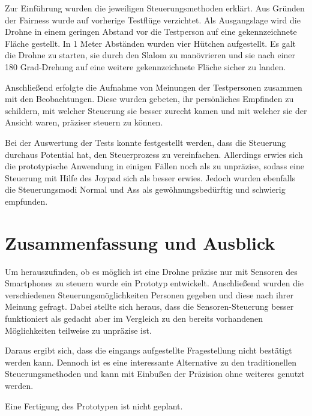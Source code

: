 \documentclass{article}
\begin{document}
Zur Einführung wurden die jeweiligen Steuerungsmethoden erklärt. Aus Gründen der Fairness wurde auf vorherige Testflüge verzichtet. Als Ausgangslage wird die Drohne in einem geringen Abstand vor die Testperson auf eine gekennzeichnete Fläche gestellt. In 1 Meter Abständen wurden vier Hütchen aufgestellt. Es galt die Drohne zu starten, sie durch den Slalom zu manövrieren und sie nach einer 180 Grad-Drehung auf eine weitere gekennzeichnete Fläche sicher zu landen.

Anschließend erfolgte die Aufnahme von Meinungen der Testpersonen zusammen mit den Beobachtungen. Diese wurden gebeten, ihr persönliches Empfinden zu schildern, mit welcher Steuerung sie besser zurecht kamen und mit welcher sie der Ansicht waren, präziser steuern zu können.

Bei der Auswertung der Tests konnte festgestellt werden, dass die Steuerung durchaus Potential hat, den Steuerprozess zu vereinfachen. Allerdings erwies sich die prototypische Anwendung in einigen Fällen noch als zu unpräzise, sodass eine Steuerung mit Hilfe des Joypad sich als besser erwies. Jedoch wurden ebenfalls die Steuerungsmodi Normal und Ass als gewöhnungsbedürftig und schwierig empfunden.

\section{Zusammenfassung und Ausblick}
Um herauszufinden, ob es möglich ist eine Drohne präzise nur mit Sensoren des Smartphones zu steuern wurde ein Prototyp entwickelt. Anschließend wurden die verschiedenen Steuerungsmöglichkeiten Personen gegeben und diese nach ihrer Meinung gefragt. Dabei stellte sich heraus, dass die Sensoren-Steuerung besser funktioniert als gedacht aber im Vergleich zu den bereits vorhandenen Möglichkeiten teilweise zu unpräzise ist. 

Daraus ergibt sich, dass die eingangs aufgestellte Fragestellung nicht bestätigt werden kann. Dennoch ist es eine interessante Alternative zu den traditionellen Steuerungsmethoden und kann mit Einbußen der Präzision ohne weiteres genutzt werden.

Eine Fertigung des Prototypen ist nicht geplant.

{}

\end{document}
